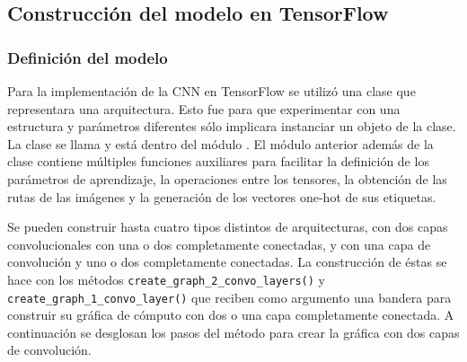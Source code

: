 
\subsection{Construcción del modelo en TensorFlow}
\label{\detokenize{model_desc:creacion-y-ejecucion-de-la-grafica-de-tensorflow}}

\subsubsection{Definición del modelo}

Para la implementación de la CNN en TensorFlow
se utilizó una clase que representara una
arquitectura. Esto fue para que experimentar con
una estructura y parámetros diferentes sólo
implicara instanciar un objeto de la clase.
La clase se llama  y
está dentro del módulo {\hyperref[\detokenize{model_desc:module-cnn\_indoor\_classifier\_model}]{}}.
El módulo anterior además de la clase contiene múltiples
funciones auxiliares para facilitar la definición
de los parámetros de aprendizaje, la operaciones entre los
tensores, la obtención de las rutas de las imágenes
y la generación de los vectores one-hot de sus etiquetas.

Se pueden construir hasta cuatro tipos distintos de
arquitecturas, con dos capas convolucionales con una o dos
completamente conectadas, y con una capa de convolución
y uno o dos completamente conectadas.
La construcción de éstas se hace con los métodos
\texttt{create\_graph\_2\_convo\_layers()}
y \texttt{create\_graph\_1\_convo\_layer()}
que reciben como argumento una bandera para construir su gráfica
de cómputo con dos o una capa completamente conectada. A
continuación se desglosan los pasos del método para
crear la gráfica con dos capas de convolución.

